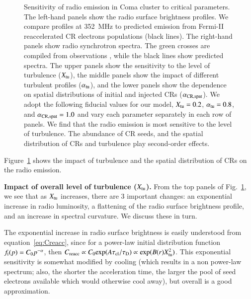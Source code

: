 \documentclass[fleqn,usenatbib,useAMS]{mnras}
\begin{document}
\begin{figure}
\begin{minipage}{1\columnwidth}
\begin{center}
   \end{center}
\end{minipage}
\caption{Sensitivity of radio emission in Coma cluster to critical
  parameters. The left-hand panels show the radio surface brightness
  profiles. We compare profiles at 352~MHz \citep[blue
    crosses,][]{brown11} to predicted emission from Fermi-II
  reaccelerated CR electrons populations (black lines). The right-hand
  panels show radio synchrotron spectra. The green crosses are
  compiled from observations \citep{2010PhDT.......259P}, while the
  black lines show predicted spectra. The upper panels show the sensitivity to the level of
  turbulence ($X_{\mathrm{tu}}$), the middle panels show the impact of
  different turbulent profiles ($\alpha_{\mathrm{tu}}$), and the lower
  panels show the dependence on spatial distributions of initial and
  injected CRs ($\alpha_{\mathrm{CR,spat}}$). We adopt the following
  fiducial values for our model, $X_{\mathrm{tu}}=0.2$,
  $\alpha_{\mathrm{tu}}=0.8$, and $\alpha_{\mathrm{CR,spat}}=1.0$ and vary each
  parameter separately in each row of panels. We find that the radio
  emission is most sensitive to the level of turbulence. The abundance of CR seeds, and the spatial distribution of CRs and turbulence play second-order effects.}
  \label{fig:param_comp}
\end{figure}

Figure~\ref{fig:param_comp} shows the impact of turbulence and the
spatial distribution of CRs on the radio emission. 

{\bf Impact of overall level of turbulence ($X_{\rm tu}$).} From the top panels of Fig.~\ref{fig:param_comp}, we see that as $X_{\rm tu}$ increases, there are 3 important changes: an exponential increase in radio luminosity, a flattening of the radio surface brightness profile, and an increase in spectral curvature. We discuss these in turn. 

The exponential increase in radio surface brightness is easily understood from equation~\ref{eq:Creacc}, since for a power-law initial distribution function $f_{\rm i}(p) = C_{\rm 0} p^{-\alpha}$, then $C_{\rm reacc} \propto C_{\rm 0} {\rm exp}(A \tau_{\rm cl}/\tau_{\rm D}) \propto {\rm exp} (B(r) X_{\rm tu}^{2})$. This exponential sensitivity is somewhat modified by cooling (which results in a non power-law spectrum; also, the shorter the acceleration time, the larger the pool of seed electrons available which would otherwise cool away), but overall is a good approximation. %
\end{document}
